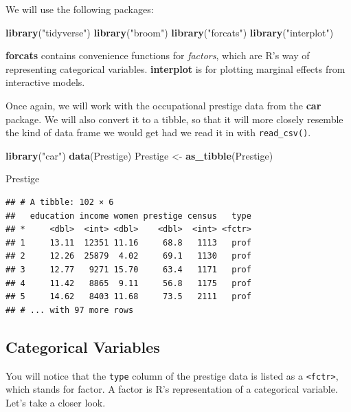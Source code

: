 \documentclass[12pt,oneside,openany]{book}
\newenvironment{Shaded}{\begin{snugshade}}{\end{snugshade}}
\newcommand{\KeywordTok}[1]{\textcolor[rgb]{0.13,0.29,0.53}{\textbf{#1}}}
\newcommand{\StringTok}[1]{\textcolor[rgb]{0.31,0.60,0.02}{#1}}
\newcommand{\NormalTok}[1]{#1}
\begin{document}
We will use the following packages:

\begin{Shaded}
\begin{Highlighting}[]
\KeywordTok{library}\NormalTok{(}\StringTok{"tidyverse"}\NormalTok{)}
\KeywordTok{library}\NormalTok{(}\StringTok{"broom"}\NormalTok{)}
\KeywordTok{library}\NormalTok{(}\StringTok{"forcats"}\NormalTok{)}
\KeywordTok{library}\NormalTok{(}\StringTok{"interplot"}\NormalTok{)}
\end{Highlighting}
\end{Shaded}

\textbf{forcats} contains convenience functions for \emph{factors},
which are R's way of representing categorical variables.
\textbf{interplot} is for plotting marginal effects from interactive
models.

Once again, we will work with the occupational prestige data from the
\textbf{car} package. We will also convert it to a tibble, so that it
will more closely resemble the kind of data frame we would get had we
read it in with \texttt{read\_csv()}.

\begin{Shaded}
\begin{Highlighting}[]
\KeywordTok{library}\NormalTok{(}\StringTok{"car"}\NormalTok{)}
\KeywordTok{data}\NormalTok{(Prestige)}
\NormalTok{Prestige <-}\StringTok{ }\KeywordTok{as_tibble}\NormalTok{(Prestige)}

\NormalTok{Prestige}
\end{Highlighting}
\end{Shaded}

\begin{verbatim}
## # A tibble: 102 × 6
##   education income women prestige census   type
## *     <dbl>  <int> <dbl>    <dbl>  <int> <fctr>
## 1     13.11  12351 11.16     68.8   1113   prof
## 2     12.26  25879  4.02     69.1   1130   prof
## 3     12.77   9271 15.70     63.4   1171   prof
## 4     11.42   8865  9.11     56.8   1175   prof
## 5     14.62   8403 11.68     73.5   2111   prof
## # ... with 97 more rows
\end{verbatim}

\subsection{Categorical Variables}\label{categorical-variables-1}

You will notice that the \texttt{type} column of the prestige data is
listed as a \texttt{\textless{}fctr\textgreater{}}, which stands for
factor. A factor is R's representation of a categorical variable. Let's
take a closer look.
\end{document}
